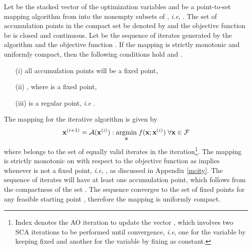 Let \me{\mbf{\ma} \triangleq [\mx,\my,\mz]} be the stacked vector of the optimization variables and  be a point-to-set mapping algorithm from  into the nonempty subsets of , \textit{i.e}, . The set of accumulation points in the compact set  be denoted by  and the objective function be  is closed and continuous. Let  be the sequence of iterates generated by the algorithm  and the objective function . If the mapping is strictly monotonic and uniformly compact, then the following conditions hold \cite{zangwill1969nonlinear} and \cite[Theorem 3.1]{meyer1976sufficient}.
\begin{itemize}
\item[(i)] all accumulation points will be a fixed point,
\item[(ii)] , where \eqn{\ma^\ast} is a fixed point,
\item[(iii)] \eqn{\ma^\ast} is a regular point, \textit{i.e} .
\end{itemize}

The mapping  for the iterative algorithm is given by
\begin{equation}
{\mathbf{x}}^{(i+1)} = \mathcal{A}({\mathbf{x}}^{(i)}) : \underset{\mathbf{x}}{\mathrm{argmin}} \; f(\mathbf{x};{\mathbf{x}}^{(i)}) \; \forall \mathbf{x} \in \mathcal{F}
\end{equation}
where  belongs to the set of equally valid iterates  in the  iteration\footnote{Index  denotes the \ac{AO} iteration to update the vector \me{\ma}, which involves two \ac{SCA} iterations to be performed until convergence, \textit{i.e}, one for the variable \me{\mx} by keeping \me{\my} fixed and another for the variable \me{\my} by fixing \me{\mx} as constant.}. The mapping is strictly monotonic on  with respect to the objective function as  implies  whenever \me{\ma} is not a fixed point, \textit{i.e}, , as discussed in Appendix \ref{mcity}. The sequence of iterates  will have at least one accumulation point, which follows from the compactness of the set \cite{zangwill1969nonlinear}. The sequence  converges to the set of fixed points  for any feasible starting point , therefore the mapping is uniformly compact.

